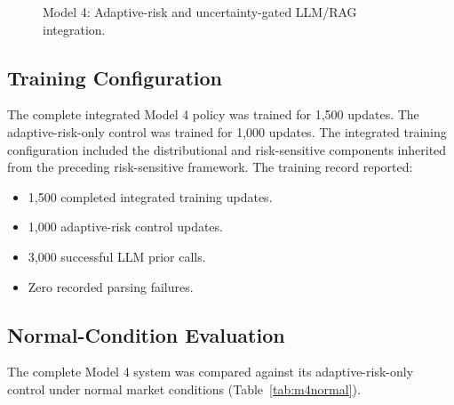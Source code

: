 \documentclass[conference]{IEEEtran}
\begin{document}
\begin{figure}[!t]
\centering
{}
\caption{Model 4: Adaptive-risk and uncertainty-gated LLM/RAG integration.}
\label{fig:m4arch}
\end{figure}

\subsection{Training Configuration}
The complete integrated Model 4 policy was trained for 1,500 updates. The adaptive-risk-only control was trained for 1,000 updates. The integrated training configuration included the distributional and risk-sensitive components inherited from the preceding risk-sensitive framework. The training record reported:
\begin{itemize}
  \item 1,500 completed integrated training updates.
  \item 1,000 adaptive-risk control updates.
  \item 3,000 successful LLM prior calls.
  \item Zero recorded parsing failures.
\end{itemize}

\subsection{Normal-Condition Evaluation}
The complete Model 4 system was compared against its adaptive-risk-only control under normal market conditions (Table~\ref{tab:m4normal}).
\end{document}
